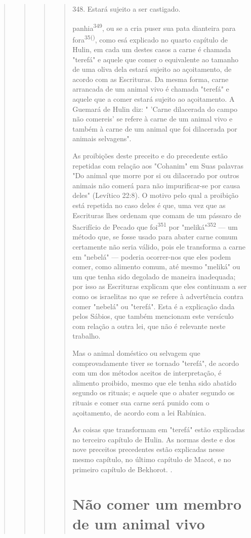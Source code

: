 \begin{quote}
\begin{quote}
\begin{quote}
\begin{quote}
348. Estará sujeito a ser castigado.

panhia\textsuperscript{349}, ou se a cria puser sua pata dianteira para
fora\textsuperscript{35()}, como esá explica­do no quarto capítulo de
Hulin, em cada um destes casos a carne é chamada "terefá" e aquele que
comer o equivalente ao tamanho de uma oliva dela estará sujeito ao
açoitamento, de acordo com as Escrituras. Da mesma forma, carne
arrancada de um animal vivo é chamada "terefá" e aquele que a comer
estará sujeito ao açoitamento. A Guemará de Hulin diz: " 'Carne
dilacerada do campo não comereis' se refere à carne de um animal vivo e
também à carne de um animal que foi dilacerada por animais selvagens".

As proibições deste preceito e do precedente estão repetidas com relação
aos "Cohanim" em Suas palavras "Do animal que morre por si ou
dila­cerado por outros animais não comerá para não impurificar-se por
causa de­les" (Levítico 22:8). O motivo pelo qual a proibição está
repetida no caso deles é que, uma vez que as Escrituras lhes ordenam que
comam de um pássaro de Sacrifício de Pecado que foi\textsuperscript{351}
por "meliká"\textsuperscript{352} --- um método que, se fosse usado para
abater carne comum certamente não seria válido, pois ele transfor­ma a
carne em "nebelá" --- poderia ocorrer-nos que eles podem comer, como
alimento comum, até mesmo "meliká" ou um que tenha sido degolado de
ma­neira inadequada; por isso as Escrituras explicam que eles continuam
a ser co­mo os israelitas no que se refere à advertência contra comer
"nebelá" ou "tere­fá". Esta é a explicação dada pelos Sábios, que também
mencionam este versí­culo com relação a outra lei, que não é relevante
neste trabalho.

Mas o animal doméstico ou selvagem que comprovadamente tiver se tornado
"terefá", de acordo com um dos métodos aceitos de interpretação, é
alimento proibido, mesmo que ele tenha sido abatido segundo os rituais;
e aquele que o abater segundo os rituais e comer sua carne será punido
com o açoitamento, de acordo com a lei Rabínica.

As coisas que transformam em "terefá" estão explicadas no terceiro
capítulo de Hulin. As normas deste e dos nove preceitos precedentes
estão ex­plicadas nesse mesmo capítulo, no último capítulo de Macot, e
no primeiro ca­pítulo de Bekhorot. .

\section{Não comer um membro de um animal vivo}


\end{quote}
\end{quote}
\end{quote}
\end{quote}
